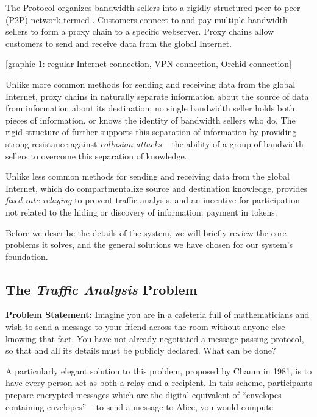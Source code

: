 The \Orchid{} Protocol organizes bandwidth sellers into a rigidly
structured peer-to-peer (P2P) network termed \tOM{}. Customers connect to
\tOM{} and pay multiple bandwidth sellers to form a proxy chain to a
specific webserver. Proxy chains allow customers to send and receive
data from the global Internet.

[graphic 1: regular Internet connection, VPN connection, Orchid connection]

Unlike more common methods for sending and receiving data from the
global Internet, proxy chains in \tOM{} naturally separate information
about the source of data from information about its destination; no
single bandwidth seller holds both pieces of information, or knows the
identity of bandwidth sellers who do. The rigid structure of \tOM{}
further supports this separation of information by providing strong
resistance against \emph{collusion attacks} -- the ability of a group
of bandwidth sellers to overcome this separation of knowledge.

Unlike less common methods for sending and receiving data from the
global Internet, which do compartmentalize source and destination
knowledge, \tOM{} provides \emph{fixed rate relaying} to prevent
traffic analysis, and an incentive for participation not related to
the hiding or discovery of information: payment in tokens.

Before we describe the details of the system, we will briefly review
the core problems it solves, and the general solutions we have chosen
for our system's foundation.

\subsection{The \emph{Traffic Analysis} Problem}

\textbf{Problem Statement:} Imagine you are in a cafeteria full of
mathematicians and wish to send a message to your friend across the
room without anyone else knowing that fact. You have not already
negotiated a message passing protocol, so that and all its details
must be publicly declared. What can be done?

A particularly elegant solution to this problem, proposed by Chaum in
1981\cite{chaum-mix}, is to have every person act as both a relay and
a recipient. In this scheme, participants prepare encrypted messages
which are the digital equivalent of ``envelopes containing envelopes''
-- to send a message to Alice, you would compute

